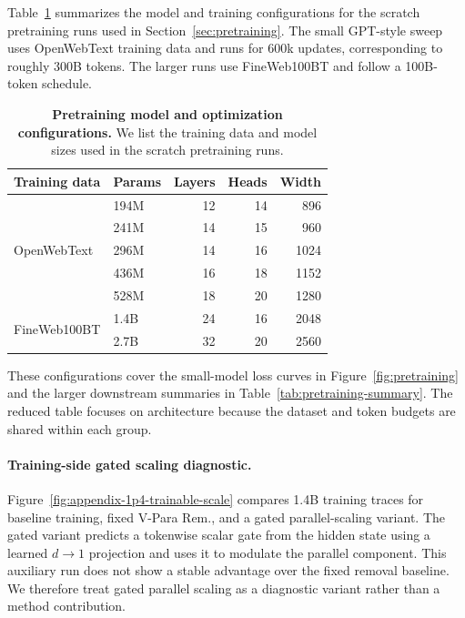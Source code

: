 Table~\ref{tab:appendix-training-configs} summarizes the model and training
configurations for the scratch pretraining runs used in
Section~\ref{sec:pretraining}. The small GPT-style sweep uses OpenWebText
training data and runs for 600k updates, corresponding to roughly 300B
tokens. The larger runs use FineWeb100BT and follow a 100B-token schedule.

\begin{table}[h]
  \caption{\textbf{Pretraining model and optimization configurations.}
  We list the training data and model sizes used in the scratch pretraining
  runs.}
  \label{tab:appendix-training-configs}
  \centering
  \small
  \setlength{\tabcolsep}{6pt}
  \begin{tabular}{llrrr}
    \toprule
    Training data & Params & Layers & Heads & Width \\
    \midrule
    \multirow{5}{*}{OpenWebText}
      & 194M & 12 & 14 & 896  \\
      & 241M & 14 & 15 & 960  \\
      & 296M & 14 & 16 & 1024 \\
      & 436M & 16 & 18 & 1152 \\
      & 528M & 18 & 20 & 1280 \\
    \midrule
    \multirow{2}{*}{FineWeb100BT}
      & 1.4B & 24 & 16 & 2048 \\
      & 2.7B & 32 & 20 & 2560 \\
    \bottomrule
\end{tabular}
\end{table}

These configurations cover the small-model loss curves in
Figure~\ref{fig:pretraining} and the larger downstream summaries in
Table~\ref{tab:pretraining-summary}. The reduced table focuses on architecture
because the dataset and token budgets are shared within each group.

\paragraph{Training-side gated scaling diagnostic.}
Figure~\ref{fig:appendix-1p4-trainable-scale} compares 1.4B training traces
for baseline training, fixed V-Para Rem., and a gated parallel-scaling
variant. The gated variant predicts a tokenwise scalar gate from the hidden
state using a learned \(d\!\to\!1\) projection and uses it to modulate the
parallel component. This auxiliary run does not show a stable advantage over
the fixed removal baseline. We therefore treat gated parallel scaling as a
diagnostic variant rather than a method contribution.

